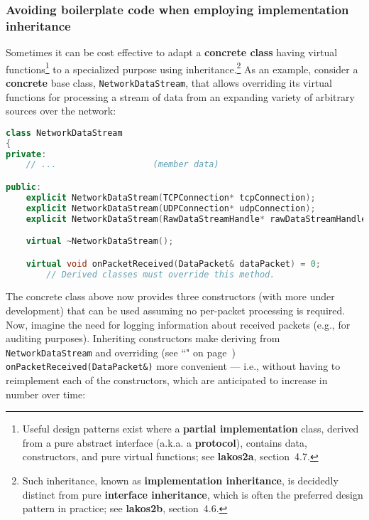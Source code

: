 \subsubsection[Avoiding boilerplate code when employing implementation inheritance]{Avoiding boilerplate code when employing implementation inheritance}\label{avoiding-boilerplate-code-when-employing-implementation-inheritance}

Sometimes it can be cost effective to adapt a \textbf{concrete class}
having virtual functions{\cprotect\footnote{Useful design patterns
exist where a \textbf{partial implementation} class, derived from a
pure abstract interface (a.k.a. a \textbf{protocol}), contains data,
constructors, and pure virtual functions; see
  \textbf{lakos2a}, section~4.7.}} to a specialized purpose
using inheritance.{\cprotect\footnote{Such inheritance, known as
\textbf{implementation inheritance}, is decidedly distinct from pure
\textbf{interface inheritance}, which is often the preferred design
  pattern in practice; see \textbf{{lakos2b}}, section~4.6.}}
As an example, consider a \textbf{concrete} base class,
\texttt{NetworkDataStream}, that allows overriding its virtual functions
for processing a stream of data from an expanding variety of arbitrary
sources over the network:

\begin{lstlisting}[language=C++]
class NetworkDataStream
{
private:
    // ...                   (member data)

public:
    explicit NetworkDataStream(TCPConnection* tcpConnection);
    explicit NetworkDataStream(UDPConnection* udpConnection);
    explicit NetworkDataStream(RawDataStreamHandle* rawDataStreamHandle);

    virtual ~NetworkDataStream();

    virtual void onPacketReceived(DataPacket& dataPacket) = 0;
        // Derived classes must override this method.
\end{lstlisting}

\noindent The concrete class above now provides three constructors (with more
under development) that can be used assuming no per-packet processing is
required. Now, imagine the need for logging information about received
packets (e.g., for auditing purposes). Inheriting constructors make
deriving from \texttt{NetworkDataStream} and overriding (see
``" on page~\pageref{override})
\texttt{onPacketReceived(DataPacket\&)} more convenient --- i.e.,
without having to reimplement each of the constructors, which are
anticipated to increase in number over time:


